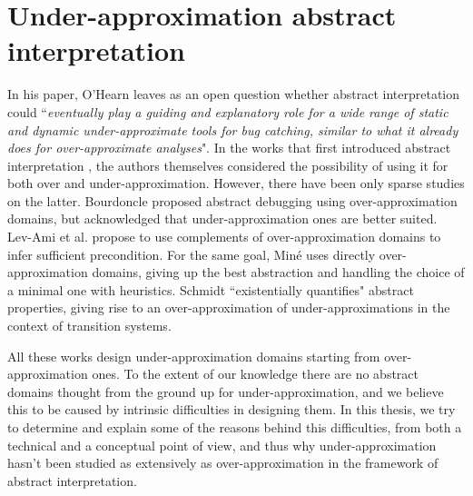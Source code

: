 \section{Under-approximation abstract interpretation}
In his paper, O'Hearn leaves as an open question whether abstract interpretation could ``\textit{eventually play a guiding and explanatory role for a wide range of static and dynamic under-approximate tools for bug catching, similar to what it already does for over-approximate analyses}".
In the works that first introduced abstract interpretation \cite{cousot-77}, the authors themselves considered the possibility of using it for both over and under-approximation. However, there have been only sparse studies on the latter.
Bourdoncle \cite{bourdoncle-abs-debugging} proposed abstract debugging using over-approximation domains, but acknowledged that under-approximation ones are better suited.
Lev-Ami et al. \cite{lev-backward-analysis-complement} propose to use complements of over-approximation domains to infer sufficient precondition.
For the same goal, Miné \cite{mine-backward-underapprox-14} uses directly over-approximation domains, giving up the best abstraction and handling the choice of a minimal one with heuristics.
Schmidt \cite{schmidt-higher-order-approx-2007} ``existentially quantifies" abstract properties, giving rise to an over-approximation of under-approximations in the context of transition systems.

All these works design under-approximation domains starting from over-approximation ones. To the extent of our knowledge there are no abstract domains thought from the ground up for under-approximation, and we believe this to be caused by intrinsic difficulties in designing them. In this thesis, we try to determine and explain some of the reasons behind this difficulties, from both a technical and a conceptual point of view, and thus why under-approximation hasn't been studied as extensively as over-approximation in the framework of abstract interpretation.

